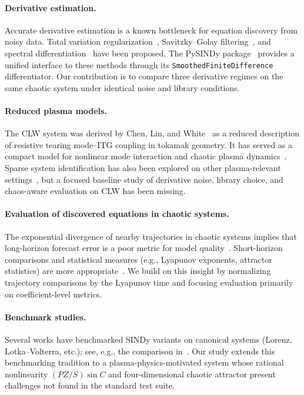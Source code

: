\documentclass[12pt]{article}
\begin{document}
\paragraph{Derivative estimation.}
Accurate derivative estimation is a known bottleneck for equation discovery from noisy data.
Total variation regularization~\cite{Chartrand2011}, Savitzky--Golay filtering~\cite{Savitzky1964}, and spectral differentiation~\cite{Schaeffer2017} have been proposed.
The PySINDy package~\cite{deSilva2020,Kaptanoglu2022} provides a unified interface to these methods through its \texttt{SmoothedFiniteDifference} differentiator.
Our contribution is to compare three derivative regimes on the same chaotic system under identical noise and library conditions.

\paragraph{Reduced plasma models.}
The CLW system was derived by Chen, Lin, and White~\cite{Chen1984} as a reduced description of resistive tearing mode--ITG coupling in tokamak geometry.
It has served as a compact model for nonlinear mode interaction and chaotic plasma dynamics~\cite{Horton1999}.
Sparse system identification has also been explored on other plasma-relevant settings~\cite{Dam2017,Kaptanoglu2020}, but a focused baseline study of derivative noise, library choice, and chaos-aware evaluation on CLW has been missing.

\paragraph{Evaluation of discovered equations in chaotic systems.}
The exponential divergence of nearby trajectories in chaotic systems implies that long-horizon forecast error is a poor metric for model quality~\cite{Strogatz2015}.
Short-horizon comparisons and statistical measures (e.g., Lyapunov exponents, attractor statistics) are more appropriate~\cite{Pathak2018,Vlachas2018}.
We build on this insight by normalizing trajectory comparisons by the Lyapunov time and focusing evaluation primarily on coefficient-level metrics.

\paragraph{Benchmark studies.}
Several works have benchmarked SINDy variants on canonical systems (Lorenz, Lotka--Volterra, etc.); see, e.g., the comparison in~\cite{Fasel2022}.
Our study extends this benchmarking tradition to a plasma-physics-motivated system whose rational nonlinearity $(PZ/S)\sin C$ and four-dimensional chaotic attractor present challenges not found in the standard test suite.
\end{document}
